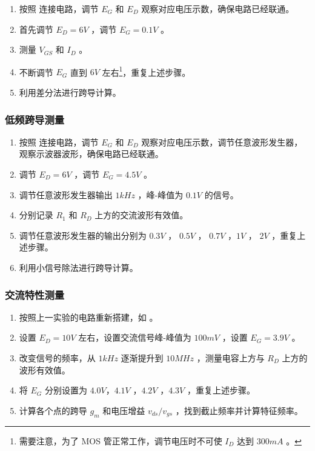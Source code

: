 \documentclass[lang=cn,11pt,a4paper,cite=authoryear]{elegantpaper}
\begin{document}
\begin{enumerate}
    \item 按照  连接电路，调节 \(E_G\) 和 \(E_D\) 观察对应电压示数，确保电路已经联通。
    \item 首先调节 \(E_D = 6 V\) ，调节 \(E_G = 0.1 V\) 。
    \item 测量 \(V_{GS}\) 和 \(I_D\) 。
    \item 不断调节 \(E_G\) 直到 \(6 V\) 左右\footnote{需要注意，为了 MOS 管正常工作，调节电压时不可使 \(I_D\) 达到 \(300 mA\) 。}，重复上述步骤。
    \item 利用差分法进行跨导计算。
\end{enumerate}


\subsubsection{低频跨导测量}

\begin{enumerate}
    \item 按照  连接电路，调节 \(E_G\) 和 \(E_D\) 观察对应电压示数，调节任意波形发生器，观察示波器波形，确保电路已经联通。
    \item 调节 \(E_D = 6 V\) ，调节 \(E_G = 4.5 V\) 。
    \item 调节任意波形发生器输出 \(1 kHz\) ，峰-峰值为 \(0.1 V\) 的信号。
    \item 分别记录 \(R_1\) 和 \(R_D\) 上方的交流波形有效值。
    \item 调节任意波形发生器的输出分别为 \(0.3 V\) ， \(0.5 V\) ， \(0.7 V\) ，\(1 V\) ， \(2 V\) ，重复上述步骤。
    \item 利用小信号除法进行跨导计算。
\end{enumerate}


\subsubsection{交流特性测量}

\begin{enumerate}
    \item 按照上一实验的电路重新搭建，如  。
    \item 设置 \(E_D = 10 V\)  左右，设置交流信号峰-峰值为 \(100 mV\) ，设置 \(E_G = 3.9 V\) 。
    \item 改变信号的频率，从 \(1 kHz\) 逐渐提升到 \(10 MHz\) ，测量电容上方与 \(R_D\) 上方的波形有效值。 
    \item 将 \(E_G\) 分别设置为 \(4.0 V\)，\(4.1 V\) ，\(4.2V\) ，\(4.3V\) ，重复上述步骤。
    \item 计算各个点的跨导 \(g_m\) 和电压增益 \(v_{ds}/v_{gs}\) ，找到截止频率并计算特征频率。
\end{enumerate}
\end{document}
